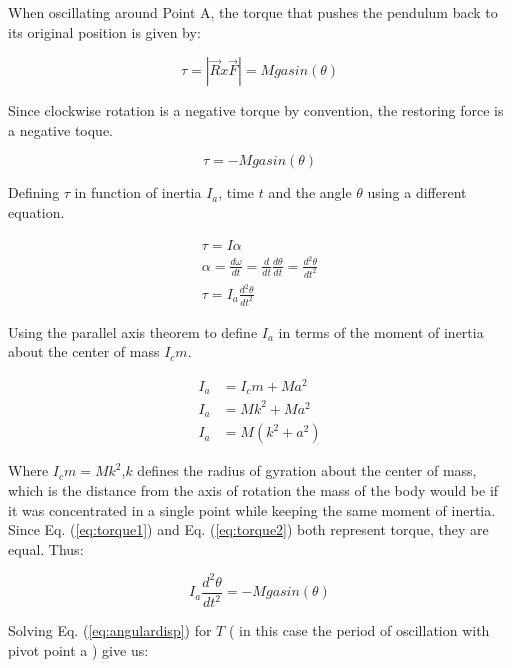 \documentclass{report}
\begin{document}
When oscillating around Point A, the torque that pushes the pendulum back to its original position is given by:

\begin{equation}\tau=|\vec{ R } x \vec{ F }| = Mgasin\left(\theta\right)\end{equation}

Since clockwise rotation is a negative torque by convention, the restoring force is a negative toque.

\begin{equation}
    \tau=-Mgasin\left(\theta\right)
\end{equation}

Defining $\tau$ in function of inertia $I_a$, time $t$ and the angle $\theta$ using a different equation.

\begin{gather*}
    \tau=I\alpha \\
    \alpha=\frac{d\omega}{dt}=\frac{d}{dt}\frac{d\theta}{dt}=\frac{d^2\theta}{dt^2}\\
    \tau=I_a\frac{d^2\theta}{dt^2} \label{eq:torque1}
\end{gather*}

Using the parallel axis theorem to define $I_a$ in terms of the moment of inertia about the center of mass $I_cm$.

\begin{equation}
    \begin{aligned}
        I_a&=I_cm + Ma^2\\ 
        I_a&=Mk^2 + Ma^2\\ 
        I_a&= M(k^2+a^2) \label{eq:torque2}
    \end{aligned}
\end{equation}

Where $I_cm = Mk^2$,$k$ defines the radius of gyration about the center of mass, which is the distance from the axis of rotation the mass of the body would be if it was concentrated in a single point while keeping the same moment of inertia. Since Eq. (\ref{eq:torque1}) and Eq. (\ref{eq:torque2}) both represent torque, they are equal. Thus:

\begin{equation}
        I_a\frac{d^2\theta}{dt^2}=-Mgasin\left(\theta\right) \label{eq:angulardisp}
\end{equation}

Solving Eq. (\ref{eq:angulardisp}) for $T$ ( in this case the period of oscillation with pivot point a ) give us:
\end{document}
